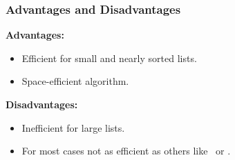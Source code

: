\subsubsection*{Advantages and Disadvantages}

\textbf{Advantages:}

\begin{itemize}
  \item Efficient for small and nearly sorted lists.
  \item Space-efficient algorithm.
\end{itemize}

\textbf{Disadvantages:}

\begin{itemize}
  \item Inefficient for large lists.
  \item For most cases not as efficient as others like \mergesrt\ or \quicksrt.
\end{itemize}
